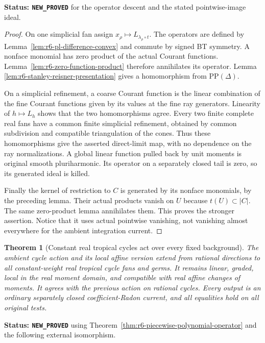 \documentclass[11pt,a4paper]{article}
\numberwithin{equation}{section}
\newtheorem{theorem}{Theorem}[section]
\theoremstyle{definition}
\theoremstyle{remark}
\begin{document}
\noindent\textbf{Status: \texttt{NEW\_PROVED}} for the
operator descent and the stated pointwise-image ideal.

\begin{proof}
On one simplicial fan assign
$x_\rho\mapsto L_{\lambda_\rho\circ t}$. The operators
are defined by Lemma~\ref{lem:r6-pl-difference-convex}
and commute by signed BT symmetry. A nonface monomial
has zero product of the actual Courant functions.
Lemma~\ref{lem:r6-zero-function-product} therefore
annihilates its operator. Lemma
\ref{lem:r6-stanley-reisner-presentation} gives a
homomorphism from $\mathrm{PP}(\Delta)$.

On a simplicial refinement, a coarse Courant function
is the linear combination of the fine Courant functions
given by its values at the fine ray generators. Linearity
of $h\mapsto L_h$ shows that the two homomorphisms agree.
Every two finite complete real fans have a common finite
simplicial refinement, obtained by common subdivision
and compatible triangulation of the cones. Thus these
homomorphisms give the asserted direct-limit map, with
no dependence on the ray normalizations. A global linear
function pulled back by unit moments is original smooth
pluriharmonic. Its operator on a separately closed tail
is zero, so its generated ideal is killed.

Finally the kernel of restriction to $C$ is generated
by its nonface monomials, by the preceding lemma. Their
actual products vanish on $U$ because $t(U)\subset|C|$.
The same zero-product lemma annihilates them. This proves
the stronger assertion. Notice that it uses actual
pointwise vanishing, not vanishing almost everywhere
for the ambient integration current.
\end{proof}

\begin{theorem}[Constant real tropical cycles act over every fixed background]
\label{thm:r6-real-ambient-cycle-action}
The ambient cycle action and its local affine version
extend from rational directions to all constant-weight
real tropical cycle fans and germs. It remains linear,
graded, local in the real moment domain, and compatible
with real affine changes of moments. It agrees with
the previous action on rational cycles. Every output
is an ordinary separately closed coefficient-Radon
current, and all equalities hold on all original tests.
\end{theorem}

\noindent\textbf{Status: \texttt{NEW\_PROVED}} using
Theorem~\ref{thm:r6-piecewise-polynomial-operator} and
the following external isomorphism.
\end{document}
